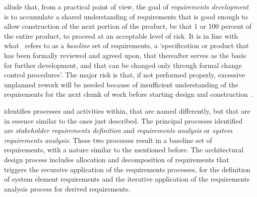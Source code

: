 \documentclass[dissertation,final]{softeng}
\begin{document}
\citet{Wiegers2013} allude that, from a practical point of view, the goal of \emph{requirements development} is to accumulate a shared understanding of requirements that is good enough to allow construction of the next portion of the product, be that 1 or 100 percent of the entire product, to proceed at an acceptable level of risk. It is in line with what~ refers to as a \emph{baseline} set of requirements, a `specification or product that has been formally reviewed and agreed upon, that thereafter serves as the basis for further development, and that can be changed only through formal change control procedures'. The major risk is that, if not performed properly, excessive unplanned rework will be needed because of insufficient understanding of the requirements for the next chunk of work before starting design and construction~\citep{Wiegers2013}.

 identifies processes and activities within, that are named differently, but that are in essence similar to the ones just described. The principal processes identified are \emph{stakeholder requirements definition} and \emph{requirements analysis} or \emph{system requirements analysis}. These two processes result in a baseline set of requirements, with a nature similar to the mentioned before. The architectural design process includes allocation and decomposition of requirements that triggers the recursive application of the requirements processes, for the definition of system element requirements and the iterative application of the requirements analysis process for derived requirements.
\end{document}
